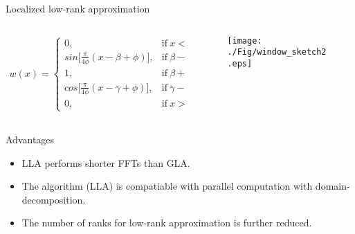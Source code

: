 \documentclass[aspectratio=169]{beamer}
\begin{document}
\begin{frame}{Localized low-rank approximation}
\begin{columns}
  \begin{column}{0.50\textwidth}
   \small{
    \begin{eqnarray*}
    w(x)=\begin{cases}
    0, & \mathrm{if} \ x < \beta-\phi, \\
    sin\big[\frac{\pi}{4\phi}(x-\beta+\phi)\big], & \mathrm{if} \ \beta-\phi \le x \le \beta+\phi, \\
    1, & \mathrm{if} \ \beta+\phi < x < \gamma-\phi, \\
    cos\big[\frac{\pi}{4\phi}(x-\gamma+\phi)\big], & \mathrm{if} \ \gamma-\phi \le x \le \gamma+\phi, \\
    0, & \mathrm{if} \ x > \gamma+\phi.
    \end{cases}
    \end{eqnarray*}
    }
  \end{column}
  \begin{column}{0.50\textwidth}
  \begin{figure}
  \texttt{[image: ./Fig/window\_sketch2.eps]}
  \end{figure}
  \end{column}
\end{columns}

\end{frame}
\begin{frame}{Advantages}
\begin{itemize}
\item{LLA performs shorter FFTs than GLA.}
\item{The algorithm (LLA) is compatiable with parallel computation with domain-decomposition.}
\item{The number of ranks for low-rank approximation is further reduced.}
\end{itemize}
\end{frame}
\end{document}
